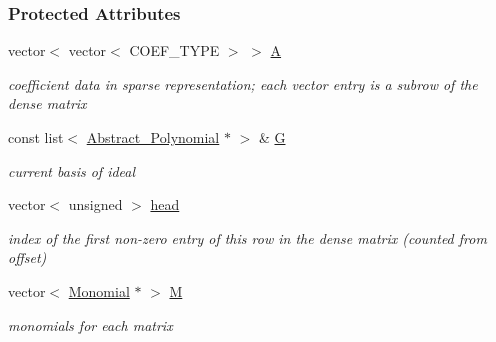 \subsubsection*{Protected Attributes}
\begin{DoxyCompactItemize}
\item 
\mbox{\label{group___g_b_computation_ae99b64462e7d5f0aef6f196a4bc5c4cd}} 
vector$<$ vector$<$ C\+O\+E\+F\+\_\+\+T\+Y\+PE $>$ $>$ \hyperlink{group___g_b_computation_ae99b64462e7d5f0aef6f196a4bc5c4cd}{A}
\begin{DoxyCompactList}\small\item\em coefficient data in sparse representation; each vector entry is a subrow of the dense matrix \end{DoxyCompactList}\item 
\mbox{\label{group___g_b_computation_a3dbc8c690c4a21ba195ae32c19982f79}} 
const list$<$ \hyperlink{group__polygroup_class_abstract___polynomial}{Abstract\+\_\+\+Polynomial} $\ast$ $>$ \& \hyperlink{group___g_b_computation_a3dbc8c690c4a21ba195ae32c19982f79}{G}
\begin{DoxyCompactList}\small\item\em current basis of ideal \end{DoxyCompactList}\item 
\mbox{\label{group___g_b_computation_a1679f8bda319a602672bc866220bb7fb}} 
vector$<$ unsigned $>$ \hyperlink{group___g_b_computation_a1679f8bda319a602672bc866220bb7fb}{head}
\begin{DoxyCompactList}\small\item\em index of the first non-\/zero entry of this row in the dense matrix (counted from offset) \end{DoxyCompactList}\item 
\mbox{\label{group___g_b_computation_a7dac72addf3ef8ff2c87c247a90eaa9d}} 
vector$<$ \hyperlink{group__polygroup_class_monomial}{Monomial} $\ast$ $>$ \hyperlink{group___g_b_computation_a7dac72addf3ef8ff2c87c247a90eaa9d}{M}
\begin{DoxyCompactList}\small\item\em monomials for each matrix \end{DoxyCompactList}\item 
\mbox{\label{group___g_b_computation_aee58b978a10b26bbdf1d518e6eb25fb5}} 

\end{DoxyCompactItemize}
